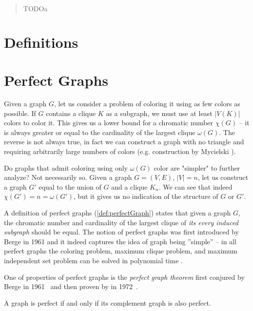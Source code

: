 \documentclass{report}
\author{Adrian Siwiec}
\date{\today{}}
\begin{document}

\pagebreak

\begin{abstract}
	TODOa
\end{abstract}

\listoftheorems[ignoreall,show={defn}]
\tableofcontents

\pagebreak

\chapter*{Definitions}


\chapter{Perfect Graphs}

Given a graph $G$, let us consider a problem of coloring it using as few colors as possible. If $G$ contains a clique $K$ as a subgraph, we must use at least $|V(K)|$ colors to color it. This gives us a lower bound for a chromatic number $\chi(G)$ -- it is always greater or equal to the cardinality of the largest clique $\omega(G)$. The reverse is not always true, in fact we can construct a graph with no triangle and requiring arbitrarily large numbers of colors (e.g. construction by Mycielski \cite{Mycielski1955}).

Do graphs that admit coloring using only $\omega(G)$ color are "simpler" to further analyze? Not necessarily so. Given a graph $G = (V, E)$, $|V| = n$, let us construct a graph $G'$ equal to the union of $G$ and a clique $K_n$. We can see that indeed $\chi(G') = n = \omega(G')$, but it gives us no indication of the structure of $G$ or $G'$.

A definition of perfect graphs (\cref{def:perfectGraph}) states that given a graph $G$, the chromatic number and cardinality of the largest clique of \emph{its every induced subgraph} should be equal. The notion of perfect graphs was first introduced by Berge in 1961 \cite{CB61} and it indeed captures the idea of graph being ''simple'' -- in all perfect graphs the coloring problem, maximum clique problem, and maximum independent set problem can be solved in polynomial time \cite{grotschel1993}.

One of properties of perfect graphs is the \emph{perfect graph theorem} first conjured by Berge in 1961~\cite{CB61} and then proven by \Lovasz in 1972~\cite{LL72}.

\begin{theorem}
	A graph is perfect if and only if its complement graph is also perfect. 
\end{theorem}
\end{document}
